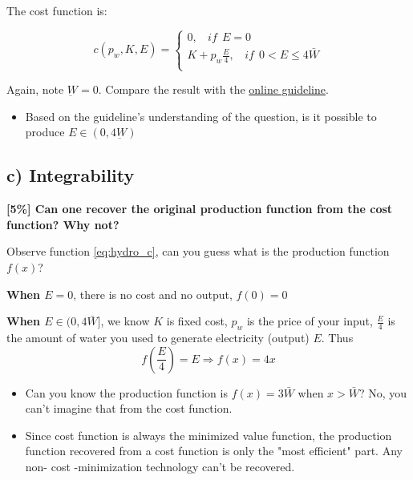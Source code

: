 \documentclass{article}
\begin{document}
The cost function is:


\begin{equation}
c(p_w,K,E)=
    \begin{cases}
0, \ \ \ \ if \ \ E = 0 \\
K + p_w\frac{E}{4}, \ \ \ \ if \ \   0 <  E \le 4\bar{W} \\
    \end{cases}
    \label{eq:hydro_c}   
\end{equation}


\begin{mdframed}[backgroundcolor=blue!20,linecolor=white]
Again, note $\underbar{W} = 0$. Compare the result with the \href{https://www.uio.no/studier/emner/sv/oekonomi/ECON4220/previous-exams/econ32_4220_2019h_sensorveiledning.pdf}{online guideline}. 

\begin{itemize}
\item Based on the guideline's understanding of the question, is it possible to produce $E \in (0, 4\underbar{W})$
\end{itemize}
\end{mdframed}


\subsection{c) Integrability}
\textbf{ [5\%] Can one recover the original production function from the
cost function? Why not?}

\begin{mdframed}[backgroundcolor=blue!20,linecolor=white]
Observe function \ref{eq:hydro_c}, can you guess what is the production function $f(x)$?

\textbf{When $E=0$}, there is no cost and no output, $f(0) = 0$

\textbf{When $E \in (0,4\bar{W}]$}, we know $K$ is fixed cost, $p_w$ is the price of your input,  $\frac{E}{4}$ is the
amount of water you used to generate electricity (output) $E$. Thus $$f(\frac{E}{4}) = E \Rightarrow f(x) = 4x$$

\begin{itemize}
\item Can you know the production function is $f(x) = 3\bar{W}$ when $x > \bar{W}$? No, you can't imagine that from the cost function.
\item Since cost function is always the minimized value function, the production function recovered from a cost function is only the "most efficient" part. Any non- cost -minimization technology can't be recovered. 
\end{itemize}
\end{mdframed}
\end{document}
